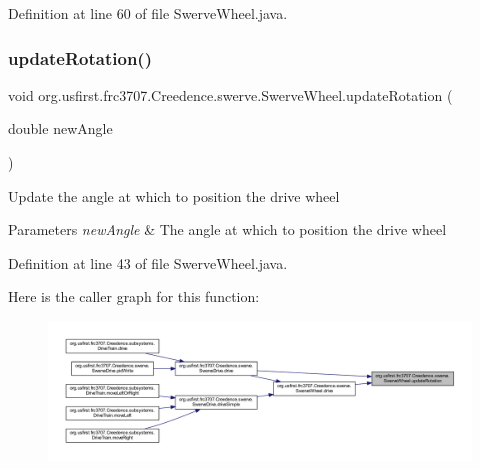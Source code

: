 Definition at line 60 of file Swerve\+Wheel.\+java.

\mbox{\label{classorg_1_1usfirst_1_1frc3707_1_1_creedence_1_1swerve_1_1_swerve_wheel_a810610eacf59fe2e0ee791c7c05df9f8}} 
\subsubsection{\texorpdfstring{updateRotation()}{updateRotation()}}
{\footnotesize\ttfamily void org.\+usfirst.\+frc3707.\+Creedence.\+swerve.\+Swerve\+Wheel.\+update\+Rotation (\begin{DoxyParamCaption}\item[{double}]{new\+Angle }\end{DoxyParamCaption})}

Update the angle at which to position the drive wheel


\begin{DoxyParams}{Parameters}
{\em new\+Angle} & The angle at which to position the drive wheel \\
\hline
\end{DoxyParams}


Definition at line 43 of file Swerve\+Wheel.\+java.

Here is the caller graph for this function\+:
\nopagebreak
\begin{figure}[H]
\begin{center}
\leavevmode
\includegraphics[width=350pt]{classorg_1_1usfirst_1_1frc3707_1_1_creedence_1_1swerve_1_1_swerve_wheel_a810610eacf59fe2e0ee791c7c05df9f8_icgraph}
\end{center}
\end{figure}
\mbox{\label{classorg_1_1usfirst_1_1frc3707_1_1_creedence_1_1swerve_1_1_swerve_wheel_ac7a7a649c8d0d48991bbab310c6f87b1}} 
